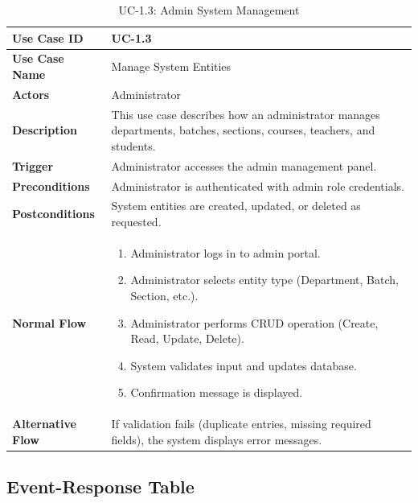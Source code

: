 \begin{table}[H]
\centering
\caption{UC-1.3: Admin System Management}

\begin{tabularx}{\textwidth}{
|>{\raggedright\arraybackslash}p{3.5cm}
|>{\raggedright\arraybackslash}X|}

\hline
\textbf{Use Case ID} & UC-1.3 \\ \hline
\textbf{Use Case Name} & Manage System Entities \\ \hline
\textbf{Actors} & Administrator \\ \hline
\textbf{Description} & This use case describes how an administrator manages departments, batches, sections, courses, teachers, and students. \\ \hline
\textbf{Trigger} & Administrator accesses the admin management panel. \\ \hline
\textbf{Preconditions} & Administrator is authenticated with admin role credentials. \\ \hline
\textbf{Postconditions} & System entities are created, updated, or deleted as requested. \\ \hline
\textbf{Normal Flow} &
\begin{enumerate}
    \item Administrator logs in to admin portal.
    \item Administrator selects entity type (Department, Batch, Section, etc.).
    \item Administrator performs CRUD operation (Create, Read, Update, Delete).
    \item System validates input and updates database.
    \item Confirmation message is displayed.
\end{enumerate}
\\ \hline
\textbf{Alternative Flow} &
If validation fails (duplicate entries, missing required fields), the system displays error messages.
\\ \hline

\end{tabularx}

\end{table}


\subsection{Event-Response Table}

